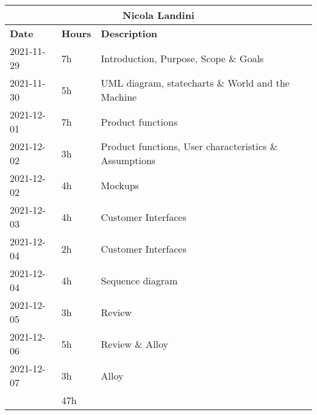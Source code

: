 \begin{table}[H]
    \centering
    \begin{tabular}{|l|l|l|}
        \multicolumn{3}{c}{\textbf{Nicola Landini}}                      \\
        \hline
        \textbf{Date} & \textbf{Hours} & \textbf{Description}                                   \\\hline
        2021-11-29    & 7h             & Introduction, Purpose, Scope \& Goals                  \\\hline
        2021-11-30    & 5h             & UML diagram, statecharts \& World and the Machine      \\\hline
        2021-12-01    & 7h             & Product functions                                      \\\hline
        2021-12-02    & 3h             & Product functions, User characteristics \& Assumptions \\\hline
        2021-12-02    & 4h             & Mockups                                                \\\hline
        2021-12-03    & 4h             & Customer Interfaces                                    \\\hline
        2021-12-04    & 2h             & Customer Interfaces                                    \\\hline
        2021-12-04    & 4h             & Sequence diagram                                       \\\hline
        2021-12-05    & 3h             & Review                                                 \\\hline
        2021-12-06    & 5h             & Review \& Alloy                                        \\\hline
        2021-12-07    & 3h             & Alloy                                                  \\\hline\hline
                      & 47h            &                                                        \\\hline
    \end{tabular}
\end{table}
